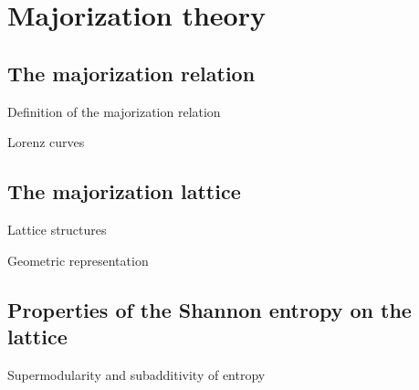 \section{Majorization theory}

\subsection{The majorization relation}

\begin{frame}{Definition of the majorization relation}
    
\end{frame}

\begin{frame}{Lorenz curves}
    
\end{frame}

\subsection{The majorization lattice}

\begin{frame}{Lattice structures}
    
\end{frame}

\begin{frame}{Geometric representation}
    
\end{frame}

\subsection{Properties of the Shannon entropy on the lattice}

\begin{frame}{Supermodularity and subadditivity of entropy}
    
\end{frame}